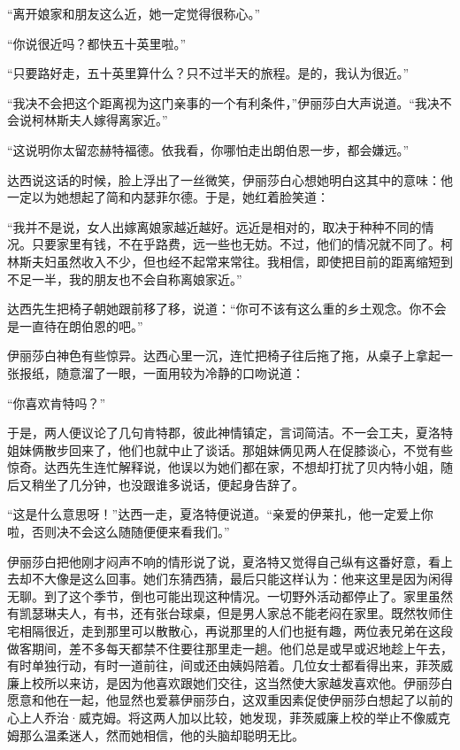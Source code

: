 \par “离开娘家和朋友这么近，她一定觉得很称心。”
\par “你说很近吗？都快五十英里啦。”
\par “只要路好走，五十英里算什么？只不过半天的旅程。是的，我认为很近。”
\par “我决不会把这个距离视为这门亲事的一个有利条件，”伊丽莎白大声说道。“我决不会说柯林斯夫人嫁得离家近。”
\par “这说明你太留恋赫特福德。依我看，你哪怕走出朗伯恩一步，都会嫌远。”
\par 达西说这话的时候，脸上浮出了一丝微笑，伊丽莎白心想她明白这其中的意味：他一定以为她想起了简和内瑟菲尔德。于是，她红着脸笑道：
\par “我并不是说，女人出嫁离娘家越近越好。远近是相对的，取决于种种不同的情况。只要家里有钱，不在乎路费，远一些也无妨。不过，他们的情况就不同了。柯林斯夫妇虽然收入不少，但也经不起常来常往。我相信，即使把目前的距离缩短到不足一半，我的朋友也不会自称离娘家近。”
\par 达西先生把椅子朝她跟前移了移，说道：“你可不该有这么重的乡土观念。你不会是一直待在朗伯恩的吧。”
\par 伊丽莎白神色有些惊异。达西心里一沉，连忙把椅子往后拖了拖，从桌子上拿起一张报纸，随意溜了一眼，一面用较为冷静的口吻说道：
\par “你喜欢肯特吗？”
\par 于是，两人便议论了几句肯特郡，彼此神情镇定，言词简洁。不一会工夫，夏洛特姐妹俩散步回来了，他们也就中止了谈话。那姐妹俩见两人在促膝谈心，不觉有些惊奇。达西先生连忙解释说，他误以为她们都在家，不想却打扰了贝内特小姐，随后又稍坐了几分钟，也没跟谁多说话，便起身告辞了。
\par “这是什么意思呀！”达西一走，夏洛特便说道。“亲爱的伊莱扎，他一定爱上你啦，否则决不会这么随随便便来看我们。”
\par 伊丽莎白把他刚才闷声不响的情形说了说，夏洛特又觉得自己纵有这番好意，看上去却不大像是这么回事。她们东猜西猜，最后只能这样认为：他来这里是因为闲得无聊。到了这个季节，倒也可能出现这种情况。一切野外活动都停止了。家里虽然有凯瑟琳夫人，有书，还有张台球桌，但是男人家总不能老闷在家里。既然牧师住宅相隔很近，走到那里可以散散心，再说那里的人们也挺有趣，两位表兄弟在这段做客期间，差不多每天都禁不住要往那里走一趟。他们总是或早或迟地趁上午去，有时单独行动，有时一道前往，间或还由姨妈陪着。几位女士都看得出来，菲茨威廉上校所以来访，是因为他喜欢跟她们交往，这当然使大家越发喜欢他。伊丽莎白愿意和他在一起，他显然也爱慕伊丽莎白，这双重因素促使伊丽莎白想起了以前的心上人乔治·威克姆。将这两人加以比较，她发现，菲茨威廉上校的举止不像威克姆那么温柔迷人，然而她相信，他的头脑却聪明无比。
